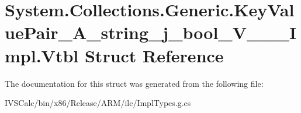 \hypertarget{struct_system_1_1_collections_1_1_generic_1_1_key_value_pair___a__string__j__bool___v_______impl_1_1_vtbl}{}\section{System.\+Collections.\+Generic.\+Key\+Value\+Pair\+\_\+\+A\+\_\+string\+\_\+j\+\_\+bool\+\_\+\+V\+\_\+\+\_\+\+\_\+\+Impl.\+Vtbl Struct Reference}
\label{struct_system_1_1_collections_1_1_generic_1_1_key_value_pair___a__string__j__bool___v_______impl_1_1_vtbl}


The documentation for this struct was generated from the following file\+:\begin{DoxyCompactItemize}
\item 
I\+V\+S\+Calc/bin/x86/\+Release/\+A\+R\+M/ilc/Impl\+Types.\+g.\+cs\end{DoxyCompactItemize}
